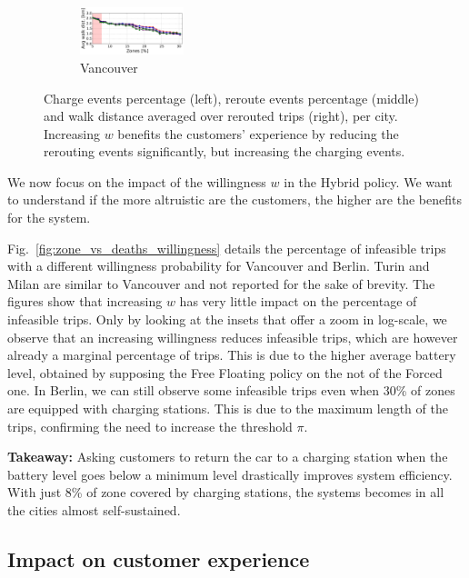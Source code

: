 \begin{figure}[t!]
\begin{center}
\begin{subfigure}{\textwidth}
            \includegraphics[width=0.33\textwidth]{figures/cut_Vancouver_AvgWalkedDistanceVsZones_Policy_44_tt-25_100_4.pdf}
             \caption{Vancouver}
             \label{fig:zone_vs_metric_vancouver}
         \end{subfigure}         
         \caption{Charge events percentage (left), reroute events percentage (middle) and walk distance averaged over rerouted trips (right),  per city. Increasing $w$ benefits the customers' experience by reducing the rerouting events significantly, but increasing the charging events.}
         \label{fig:zone_vs_metric}
\end{center}
\end{figure}

We now focus on the impact of the willingness $w$ in the Hybrid policy. We want to understand if the more altruistic are the customers, the higher are the benefits for the system.

Fig.~\ref{fig:zone_vs_deaths_willingness} details the percentage of infeasible trips with a different willingness probability for Vancouver and Berlin. Turin and Milan are similar to Vancouver and not reported for the sake of brevity. The figures show that increasing $w$ has very little impact on the percentage of infeasible trips. Only by looking at the insets that offer a zoom in log-scale, we observe that an increasing willingness reduces infeasible trips, which are however already a marginal percentage of trips. This is due to the higher average battery level, obtained by supposing the Free Floating policy on the not of the Forced one.
In Berlin, we can still observe some infeasible trips even when 30\% of zones are equipped with charging stations. This is due to the maximum length of the trips, confirming the need to increase the threshold $\pi$. 

\textbf{Takeaway:} Asking customers to return the car to a charging station when the battery level goes below a minimum level drastically improves system efficiency. With just 8\% of zone covered by charging stations, the systems becomes in all the cities almost self-sustained.

\subsection{Impact on customer experience}

